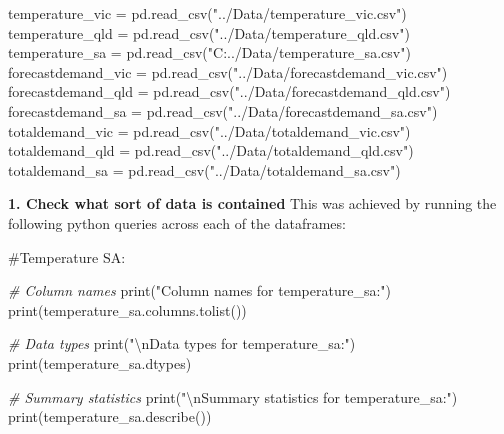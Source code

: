 \documentclass[mstat,12pt]{unswthesis}
\newenvironment{Shaded}{}{}
\newcommand{\BuiltInTok}[1]{\textcolor[rgb]{0.00,0.50,0.00}{#1}}
\newcommand{\CharTok}[1]{\textcolor[rgb]{0.25,0.44,0.63}{#1}}
\newcommand{\CommentTok}[1]{\textcolor[rgb]{0.38,0.63,0.69}{\textit{#1}}}
\newcommand{\NormalTok}[1]{#1}
\newcommand{\OperatorTok}[1]{\textcolor[rgb]{0.40,0.40,0.40}{#1}}
\newcommand{\StringTok}[1]{\textcolor[rgb]{0.25,0.44,0.63}{#1}}
\begin{document}
\begin{Shaded}
\begin{Highlighting}[]
\NormalTok{temperature\_vic }\OperatorTok{=}\NormalTok{ pd.read\_csv(}\StringTok{"../Data/temperature\_vic.csv"}\NormalTok{)}
\NormalTok{temperature\_qld }\OperatorTok{=}\NormalTok{ pd.read\_csv(}\StringTok{"../Data/temperature\_qld.csv"}\NormalTok{)}
\NormalTok{temperature\_sa }\OperatorTok{=}\NormalTok{ pd.read\_csv(}\StringTok{"C:../Data/temperature\_sa.csv"}\NormalTok{)}
\NormalTok{forecastdemand\_vic }\OperatorTok{=}\NormalTok{ pd.read\_csv(}\StringTok{"../Data/forecastdemand\_vic.csv"}\NormalTok{)}
\NormalTok{forecastdemand\_qld }\OperatorTok{=}\NormalTok{ pd.read\_csv(}\StringTok{"../Data/forecastdemand\_qld.csv"}\NormalTok{)}
\NormalTok{forecastdemand\_sa }\OperatorTok{=}\NormalTok{ pd.read\_csv(}\StringTok{"../Data/forecastdemand\_sa.csv"}\NormalTok{)}
\NormalTok{totaldemand\_vic }\OperatorTok{=}\NormalTok{ pd.read\_csv(}\StringTok{"../Data/totaldemand\_vic.csv"}\NormalTok{)}
\NormalTok{totaldemand\_qld }\OperatorTok{=}\NormalTok{ pd.read\_csv(}\StringTok{"../Data/totaldemand\_qld.csv"}\NormalTok{)}
\NormalTok{totaldemand\_sa }\OperatorTok{=}\NormalTok{ pd.read\_csv(}\StringTok{"../Data/totaldemand\_sa.csv"}\NormalTok{)}
\end{Highlighting}
\end{Shaded}

\textbf{1. Check what sort of data is contained} This was achieved by
running the following python queries across each of the dataframes:

\#Temperature SA:

\begin{Shaded}
\begin{Highlighting}[]
\CommentTok{\# Column names}
\BuiltInTok{print}\NormalTok{(}\StringTok{"Column names for temperature\_sa:"}\NormalTok{)}
\BuiltInTok{print}\NormalTok{(temperature\_sa.columns.tolist())}

\CommentTok{\# Data types}
\BuiltInTok{print}\NormalTok{(}\StringTok{"}\CharTok{\textbackslash{}n}\StringTok{Data types for temperature\_sa:"}\NormalTok{)}
\BuiltInTok{print}\NormalTok{(temperature\_sa.dtypes)}

\CommentTok{\# Summary statistics}
\BuiltInTok{print}\NormalTok{(}\StringTok{"}\CharTok{\textbackslash{}n}\StringTok{Summary statistics for temperature\_sa:"}\NormalTok{)}
\BuiltInTok{print}\NormalTok{(temperature\_sa.describe())}
\end{Highlighting}
\end{Shaded}
\end{document}
